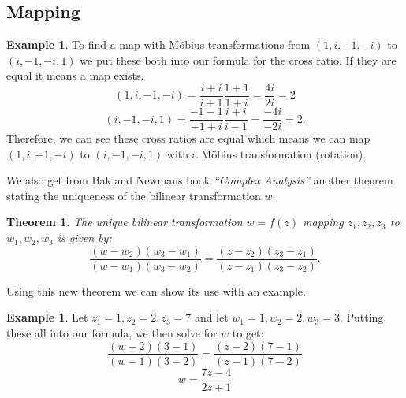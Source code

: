 \documentclass[a4paper,11pt]{article}
\newtheorem{lem}[prop]{Lemma}
\newtheorem{thm}[prop]{Theorem}
\theoremstyle{definition}
\newtheorem{ex}[prop]{Example}
\begin{document}
\subsection{Mapping}
\begin{ex}
To find a map with Möbius transformations from $(1, i, -1, -i)$ to $(i, -1, -i, 1)$ we put these both into our formula for the cross ratio. If they are equal it means a map exists.
$$ (1, i, -1, -i) = \frac{i + i}{i + 1}\frac{1 + 1}{1 + i} = \frac{4i}{2i} = 2 $$
$$ (i, -1, -i, 1) = \frac{-1-1}{-1+i}\frac{i+i}{i-1} = \frac{-4i}{-2i} = 2. $$
Therefore, we can see these cross ratios are equal which means we can map $(1, i, -1, -i)$ to $(i, -1, -i, 1)$ with a Möbius transformation (rotation). 
\end{ex}
We also get from Bak and Newmans book \textit{``Complex Analysis''} another theorem stating the uniqueness of the bilinear transformation $w$.{\autocite{Bak_Newman_2010_Complex}}
\begin{thm}
The unique bilinear transformation $w = f(z)$ mapping $z_1, z_2, z_3$ to $w_1, w_2, w_3$ is given by:
$$ \frac{(w-w_2)(w_3-w_1)}{(w-w_1)(w_3-w_2)} = \frac{(z-z_2)(z_3-z_1)}{(z-z_1)(z_3-z_2)}. $$
\end{thm}{\autocite{Bak_Newman_2010_Complex}}
Using this new theorem we can show its use with an example.
\begin{ex}
Let $z_1 = 1, z_2 = 2, z_3 = 7$ and let $w_1 = 1, w_2 = 2, w_3 = 3$. Putting these all into our formula, we then solve for $w$ to get:
$$ \frac{(w-2)(3-1)}{(w-1)(3-2)} = \frac{(z-2)(7-1)}{(z-1)(7-2)} $$
$$ w = \frac{7z-4}{2z+1}$${\autocite{Bak_Newman_2010_Complex}}
\end{ex}





\printbibliography %
\end{document}
